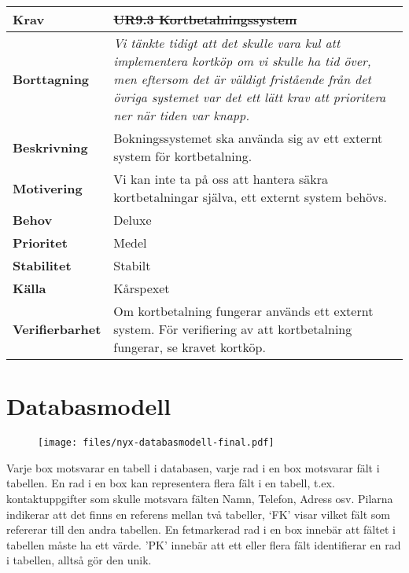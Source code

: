 \documentclass[a4paper, twoside, 11pt, titlepage]{article}
\begin{document}
		\begin {table} [ht] \begin{tabular} { p{2.6cm} p{12.5cm} }
			\hline
			{\sffamily\textbf{Krav}} & {\sffamily\textbf{\sout{UR9.3 Kortbetalningssystem}}} \\
			\hline
			{\sffamily\textbf{Borttagning}} & {\emph{Vi tänkte tidigt att det skulle vara kul att implementera kortköp om vi skulle ha tid över, men eftersom det är väldigt fristående från det övriga systemet var det ett lätt krav att prioritera ner när tiden var knapp.}} \\
			\hline
			{\sffamily\textbf{Beskrivning}} & {Bokningssystemet ska använda sig av ett externt system för kortbetalning.} \\
			\hline
			{\sffamily\textbf{Motivering}} & {Vi kan inte ta på oss att hantera säkra kortbetalningar själva, ett externt system behövs.} \\
			\hline
			{\sffamily\textbf{Behov}} & {Deluxe} \\
			\hline
			{\sffamily\textbf{Prioritet}} & {Medel} \\
			\hline
			{\sffamily\textbf{Stabilitet}} & {Stabilt} \\
			\hline
			{\sffamily\textbf{Källa}} & {Kårspexet} \\
			\hline
			{\sffamily\textbf{Verifierbarhet}} & {Om kortbetalning fungerar används ett externt system. För verifiering av att kortbetalning fungerar, se kravet kortköp.} \\
			\hline
		\end{tabular} \end{table} \FloatBarrier


\clearpage
	\appendix

\clearpage
\section{Databasmodell}


\begin{figure}[ht] \centering \texttt{[image: files/nyx-databasmodell-final.pdf]} \end{figure} \FloatBarrier

Varje box motsvarar en tabell i databasen, varje rad i en box motsvarar fält i tabellen. En rad i en box kan representera flera fält i en tabell, t.ex. kontaktuppgifter som skulle motsvara fälten Namn, Telefon, Adress osv. Pilarna indikerar att det finns en referens mellan två tabeller, ‘FK’ visar vilket fält som refererar till den andra tabellen. En fetmarkerad rad i en box innebär att fältet i tabellen måste ha ett värde. 'PK' innebär att ett eller flera fält identifierar en rad i tabellen, alltså gör den unik.
\end{document}
